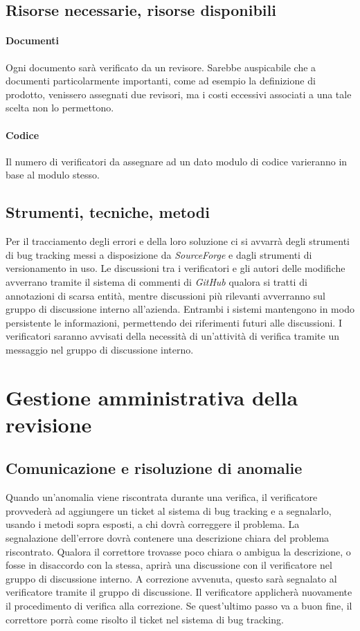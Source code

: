 \documentclass[a4paper]{article}
\begin{document}
\subsection{Risorse necessarie, risorse disponibili}
\paragraph{Documenti} Ogni documento sar\`a verificato da un revisore. Sarebbe auspicabile che a documenti particolarmente importanti, come ad esempio la definizione di prodotto, venissero assegnati due revisori, ma i costi eccessivi associati a una tale scelta non lo permettono.
\paragraph{Codice} Il numero di verificatori da assegnare ad un dato modulo di codice varieranno in base al modulo stesso.

\subsection{Strumenti, tecniche, metodi}
Per il tracciamento degli errori e della loro soluzione ci si avvarr\`a degli strumenti di bug tracking messi a disposizione da \textit{SourceForge} e dagli strumenti di versionamento in uso. \linebreak
Le discussioni tra i verificatori e gli autori delle modifiche avverrano tramite il sistema di commenti di \textit{GitHub} qualora si tratti di annotazioni di scarsa entit\`a, mentre discussioni pi\`u rilevanti avverranno sul gruppo di discussione interno all'azienda. Entrambi i sistemi mantengono in modo persistente le informazioni, permettendo dei riferimenti futuri alle discussioni.
\linebreak
I verificatori saranno avvisati della necessit\`a di un'attivit\`a di verifica tramite un messaggio nel gruppo di discussione interno. 


\section{Gestione amministrativa della revisione}

\subsection{Comunicazione e risoluzione di anomalie}
Quando un'anomalia viene riscontrata durante una verifica, il verificatore provveder\`a ad aggiungere un ticket al sistema di bug tracking e a segnalarlo, usando i metodi sopra esposti, a chi dovr\`a correggere il problema. La segnalazione dell'errore dovr\`a contenere una descrizione chiara del problema riscontrato. Qualora il correttore trovasse poco chiara o ambigua la descrizione, o fosse in disaccordo con la stessa, aprir\`a una discussione con il verificatore nel gruppo di discussione interno. A correzione avvenuta, questo sar\`a segnalato al verificatore tramite il gruppo di discussione. Il verificatore applicher\`a nuovamente il procedimento di verifica alla correzione. Se quest'ultimo passo va a buon fine, il correttore porr\`a come risolto il ticket nel sistema di bug tracking.
\end{document}
